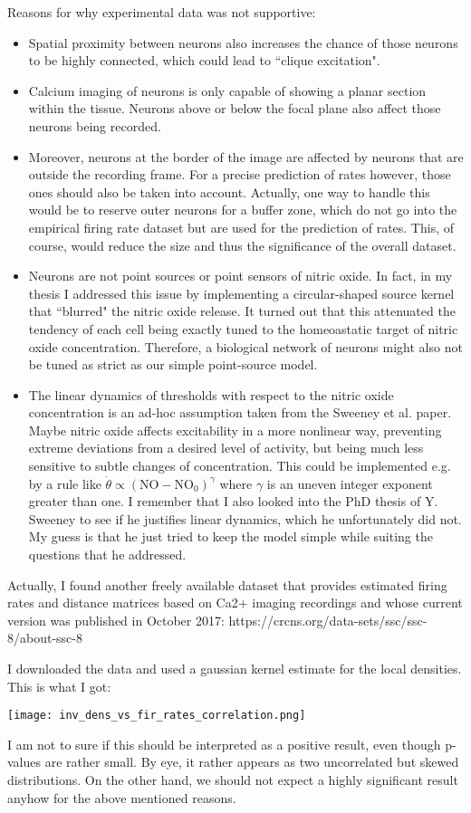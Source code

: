 \documentclass[10pt,a4paper]{article}
\author{Fabian Schubert}
\begin{document}
Reasons for why experimental data was not supportive:
\begin{itemize}
\item Spatial proximity between neurons also increases the chance of those neurons to be highly connected, which could lead to ``clique excitation".
\item Calcium imaging of neurons is only capable of showing a planar section within the tissue. Neurons above or below the focal plane also affect those neurons being recorded.
\item Moreover, neurons at the border of the image are affected by neurons that are outside the recording frame. For a precise prediction of rates however, those ones should also be taken into account. Actually, one way to handle this would be to reserve outer neurons for a buffer zone, which do not go into the empirical firing rate dataset but are used for the prediction of rates. This, of course, would reduce the size and thus the significance of the overall dataset.
\item Neurons are not point sources or point sensors of nitric oxide. In fact, in my thesis I addressed this issue by implementing a circular-shaped source kernel that ``blurred" the nitric oxide release. It turned out that this attenuated the tendency of each cell being exactly tuned to the homeoastatic target of nitric oxide concentration. Therefore, a biological network of neurons might also not be tuned as strict as our simple point-source model.
\item The linear dynamics of thresholds with respect to the nitric oxide concentration is an ad-hoc assumption taken from the Sweeney et al. paper. Maybe nitric oxide affects excitability in a more nonlinear way, preventing extreme deviations from a desired level of activity, but being much less sensitive to subtle changes of concentration. This could be implemented e.g. by a rule like $\dot{\theta} \propto (\mathrm{NO} - \mathrm{NO}_0)^\gamma$ where $\gamma$ is an uneven integer exponent greater than one. I remember that I also looked into the PhD thesis of Y. Sweeney to see if he justifies linear dynamics, which he unfortunately did not. My guess is that he just tried to keep the model simple while suiting the questions that he addressed. 
\end{itemize}

Actually, I found another freely available dataset that provides estimated firing rates and distance matrices based on Ca2+ imaging recordings and whose current version was published in October 2017: https://crcns.org/data-sets/ssc/ssc-8/about-ssc-8

I downloaded the data and used a gaussian kernel estimate for the local densities. This is what I got:

\begin{center}
\texttt{[image: inv\_dens\_vs\_fir\_rates\_correlation.png]}
\end{center}

I am not to sure if this should be interpreted as a positive result, even though p-values are rather small. By eye, it rather appears as two uncorrelated but skewed distributions. On the other hand, we should not expect a highly significant result anyhow for the above mentioned reasons. 
\end{document}

